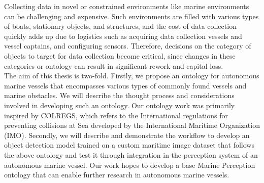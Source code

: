 Collecting data in novel or constrained environments like marine environments can be challenging and expensive. Such environments are filled with various types of boats, stationary objects, and structures, and the cost of data collection quickly adds up due to logistics such as acquiring data collection vessels and vessel captains, and configuring sensors. Therefore, decisions on the category of objects to target for data collection become critical, since changes in these categories or ontology can result in significant rework and capital loss. \\ 

The aim of this thesis is two-fold. Firstly, we propose an ontology for autonomous marine vessels that encompasses various types of commonly found vessels and marine obstacles. We will describe the thought process and considerations involved in developing such an ontology. Our ontology work was primarily inspired by COLREGS, which refers to the International regulations for preventing collisions at Sea developed by the International Maritime Organization (IMO). Secondly, we will describe and demonstrate the workflow to develop an object detection model trained on a custom maritime image dataset that follows the above ontology and test it through integration in the perception system of an autonomous marine vessel. Our work hopes to develop a base Marine Perception ontology that can enable further research in autonomous marine vessels.